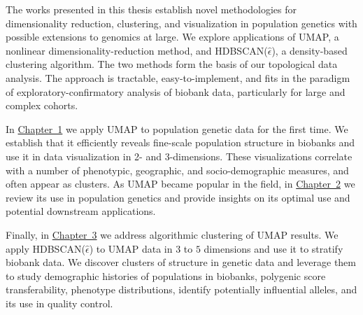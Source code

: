 The works presented in this thesis establish novel methodologies for dimensionality reduction, clustering, and visualization in population genetics with possible extensions to genomics at large. We explore applications of UMAP, a nonlinear dimensionality-reduction method, and HDBSCAN($\hat{\epsilon}$), a density-based clustering algorithm. The two methods form the basis of our topological data analysis. The approach is tractable, easy-to-implement, and fits in the paradigm of exploratory-confirmatory analysis of biobank data, particularly for large and complex cohorts.

In \hyperref[chap:chapter1]{Chapter~1} we apply UMAP to population genetic data for the first time. We establish that it efficiently reveals fine-scale population structure in biobanks and use it in data visualization in 2- and 3-dimensions. These visualizations correlate with a number of phenotypic, geographic, and socio-demographic measures, and often appear as clusters. As UMAP became popular in the field, in \hyperref[chap:chapter2]{Chapter~2} we review its use in population genetics and provide insights on its optimal use and potential downstream applications.

Finally, in \hyperref[chap:chapter3]{Chapter~3} we address algorithmic clustering of UMAP results. We apply HDBSCAN($\hat{\epsilon}$) to UMAP data in $3$ to $5$ dimensions and use it to stratify biobank data. We discover clusters of structure in genetic data and leverage them to study demographic histories of populations in biobanks, polygenic score transferability, phenotype distributions, identify potentially influential alleles, and its use in quality control.